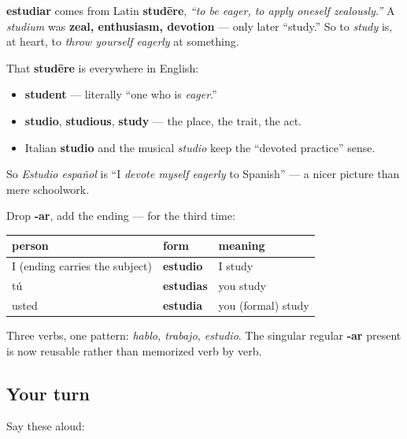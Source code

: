 \begin{cousinweb}
\textbf{estudiar} comes from Latin \textbf{studēre}, \emph{\textquotedblleft{}to be eager, to apply oneself zealously.\textquotedblright{}} A \emph{studium} was \textbf{zeal, enthusiasm, devotion} — only later \textquotedblleft{}study.\textquotedblright{} So to \emph{study} is, at heart, to \emph{throw yourself eagerly} at something.

That \textbf{studēre} is everywhere in English:

\begin{itemize}
\raggedright
  \item \textbf{student} — literally \textquotedblleft{}one who is \emph{eager}.\textquotedblright{}
  \item \textbf{studio}, \textbf{studious}, \textbf{study} — the place, the trait, the act.
  \item Italian \textbf{studio} and the musical \emph{studio} keep the \textquotedblleft{}devoted practice\textquotedblright{} sense.
\end{itemize}

So \emph{Estudio español} is \textquotedblleft{}I \emph{devote myself eagerly} to Spanish\textquotedblright{} — a nicer picture than mere schoolwork.
\end{cousinweb}

\begin{grammarlens}[title={Grammar Lens: the template holds}]
Drop \textbf{-ar}, add the ending — for the third time:

\noindent
\begin{tabularx}{\linewidth}{@{}>{\raggedright\arraybackslash}X>{\raggedright\arraybackslash}X>{\raggedright\arraybackslash}X@{}}
\toprule
\textbf{person} & \textbf{form} & \textbf{meaning} \\
\midrule
I (ending carries the subject) & \textbf{estudio} & I study \\
tú & \textbf{estudias} & you study \\
usted & \textbf{estudia} & you (formal) study \\
\bottomrule
\end{tabularx}

Three verbs, one pattern: \emph{hablo, trabajo, estudio}. The singular regular \textbf{-ar} present is now reusable rather than memorized verb by verb.
\end{grammarlens}

\subsection*{Your turn}
Say these aloud:

